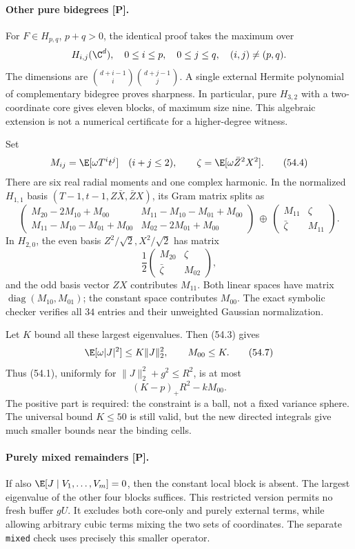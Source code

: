 \paragraph{Other pure bidegrees [P].}
For \(F\in H_{p,q}\), \(p+q>0\), the identical proof takes the
maximum over
\[
 H_{i,j}(\C^d),\quad
 0\le i\le p,\quad 0\le j\le q,\quad (i,j)\ne(p,q).
\]
The dimensions are
\(\binom{d+i-1}{i}\binom{d+j-1}{j}\).
A single external Hermite polynomial of complementary bidegree
proves sharpness. In particular, pure \(H_{3,2}\) with a
two-coordinate core gives eleven blocks, of maximum size nine.
This algebraic extension is not a numerical certificate for
a higher-degree witness.

Set
\[
 M_{ij}=\E[\omega T^it^j]\quad(i+j\le2),\qquad
 \zeta=\E[\omega\bar Z^2X^2].
 \tag{54.4}
\]
There are six real radial moments and one complex harmonic.
In the normalized \(H_{1,1}\) basis
\((T-1,t-1,Z\bar X,\bar ZX)\), its Gram matrix splits as
\[
 \begin{pmatrix}
 M_{20}-2M_{10}+M_{00}&M_{11}-M_{10}-M_{01}+M_{00}\\
 M_{11}-M_{10}-M_{01}+M_{00}&M_{02}-2M_{01}+M_{00}
 \end{pmatrix}
 \ \oplus\
 \begin{pmatrix}M_{11}&\zeta\\\bar\zeta&M_{11}\end{pmatrix}.
 \tag{54.5}
\]
In \(H_{2,0}\), the even basis \(Z^2/\sqrt2,X^2/\sqrt2\)
has matrix
\[
 \frac12\begin{pmatrix}M_{20}&\zeta\\\bar\zeta&M_{02}\end{pmatrix},
 \tag{54.6}
\]
and the odd basis vector \(ZX\) contributes \(M_{11}\).
Both linear spaces have matrix \(\operatorname{diag}(M_{10},M_{01})\);
the constant space contributes \(M_{00}\).
The exact symbolic checker verifies all \(34\) entries and their
unweighted Gaussian normalization.

Let \(K\) bound all these largest eigenvalues.
Then (54.3) gives
\[
 \E[\omega|J|^2]\le K\|J\|_2^2,\qquad M_{00}\le K.
 \tag{54.7}
\]
Thus (54.1), uniformly for \(\|J\|_2^2+g^2\le R^2\), is at most
\[
 (K-p)_+R^2-kM_{00}.
 \tag{54.8}
\]
The positive part is required: the constraint is a ball,
not a fixed variance sphere.
The universal bound \(K\le50\) is still valid, but the new
directed integrals give much smaller bounds near the binding cells.

\paragraph{Purely mixed remainders [P].}
If also \(\E[J\mid V_1,\ldots,V_m]=0\), then the constant local
block is absent. The largest eigenvalue of the other four blocks
suffices. This restricted version permits no fresh buffer \(gU\).
It excludes both core-only and purely external terms, while allowing
arbitrary cubic terms mixing the two sets of coordinates.
The separate \texttt{mixed} check uses precisely this smaller operator.

